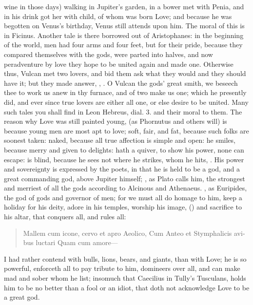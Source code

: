 wine in those days) walking in Jupiter's garden, in a bower met with
Penia, and in his drink got her with child, of whom was born Love; and
because he was begotten on Venus's birthday, Venus still attends upon
him. The moral of this is in Ficinus. Another tale is there
borrowed out of Aristophanes: in the beginning of the world, men
had four arms and four feet, but for their pride, because they compared
themselves with the gods, were parted into halves, and now peradventure
by love they hope to be united again and made one. Otherwise thus,
Vulcan met two lovers, and bid them ask what they would and they
should have it; but they made answer, , \etc{}. O
Vulcan the gods' great smith, we beseech thee to work us anew in thy
furnace, and of two make us one; which he presently did, and ever since
true lovers are either all one, or else desire to be united. Many such
tales you shall find in Leon Hebreus, dial. 3. and their moral to them.
The reason why Love was still painted young, (as Phornutus and
others will) is because young men are most apt to love; soft,
fair, and fat, because such folks are soonest taken: naked, because all
true affection is simple and open: he smiles, because merry and given
to delights: hath a quiver, to show his power, none can escape: is
blind, because he sees not where he strikes, whom he hits, \etc{}. His
power and sovereignty is expressed by the poets, in that he is
held to be a god, and a great commanding god, above Jupiter himself;
, as Plato calls him, the strongest and merriest of all
the gods according to Alcinous and Athenaeus. , as Euripides, the god of gods and governor of men;
for we must all do homage to him, keep a holiday for his deity, adore
in his temples, worship his image, ()
and sacrifice to his altar, that conquers all, and rules all:

\begin{latin}
\begin{verse}%
Mallem cum icone, cervo et apro Aeolico,
Cum Anteo et Stymphalicis avibus luctari
Quam cum amore---
\end{verse}%
\end{latin}

I had rather contend with bulls, lions, bears, and giants, than with
Love; he is so powerful, enforceth all to pay tribute to him,
domineers over all, and can make mad and sober whom he list; insomuch
that Caecilius in Tully's Tusculans, holds him to be no better than a
fool or an idiot, that doth not acknowledge Love to be a great god.

